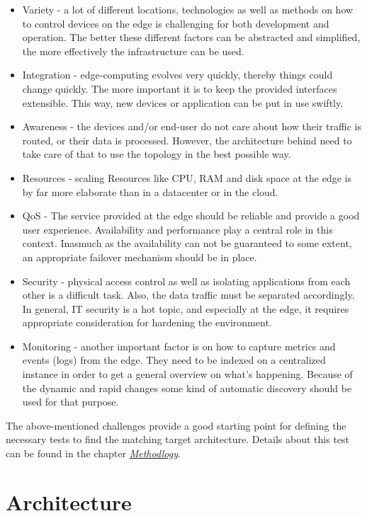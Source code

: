 \documentclass[MSC,Master,english]{twbook}%
\begin{document}
\begin{itemize}
    \item Variety - a lot of different locations, technologies as well as methods on how to control devices on the edge is challenging for both development and operation. The better these different factors can be abstracted and simplified, the more effectively the infrastructure can be used.
    \item Integration - edge-computing evolves very quickly, thereby things could change quickly. The more important it is to keep the provided interfaces extensible. This way, new devices or application can be put in use swiftly. 
    \item Awareness - the devices and/or end-user do not care about how their traffic is routed, or their data is processed. However, the architecture behind need to take care of that to use the topology in the best possible way.
    \item Resources - scaling Resources like \ac{CPU}, \ac{RAM} and disk space at the edge is by far more elaborate than in a datacenter or in the cloud.
    \item \ac{QoS} - The service provided at the edge should be reliable and provide a good user experience. Availability and performance play a central role in this context. Inasmuch as the availability can not be guaranteed to some extent, an appropriate failover mechanism should be in place.
    \item Security - physical access control as well as isolating applications from each other is a difficult task. Also, the data traffic must be separated accordingly. In general, \ac{IT} security is a hot topic, and especially at the edge, it requires appropriate consideration for hardening the environment.
    \item Monitoring - another important factor is on how to capture metrics and events (logs) from the edge. They need to be indexed on a centralized instance in order to get a general overview on what's happening. Because of the dynamic and rapid changes some kind of automatic discovery should be used for that purpose.
\end{itemize}
The above-mentioned challenges provide a good starting point for defining the necessary tests to find the matching target architecture. Details about this test can be found in the chapter \textit{\hyperref[sec:dsrmethode]{Methodlogy}}.


\section{Architecture}
\label{sec:architecture}
\end{document}
